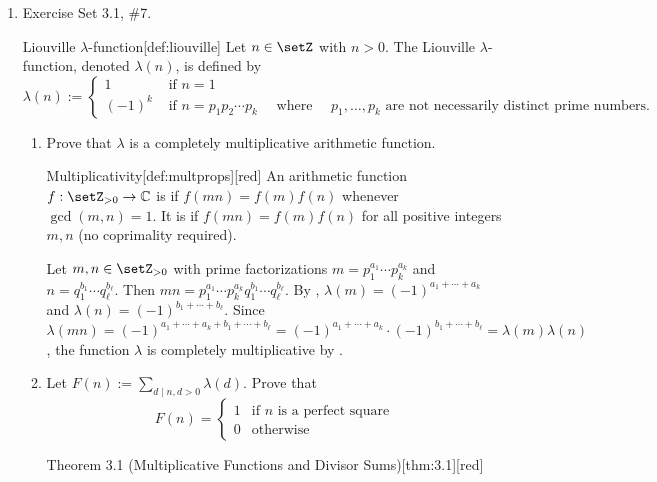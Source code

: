 \begin{enumerate}
  \newpage


  




  \item Exercise Set 3.1, \#7.
  \begin{define}{Liouville $\lambda$-function}[def:liouville]
    Let $n \in \setZ$ with $n>0$. The Liouville $\lambda$-function, 
    denoted $\lambda(n)$, is defined by
    $$
    \lambda(n):= 
    \begin{cases}
      1 & \text { if } n=1 \\ 
      (-1)^k & \text { if } n=p_1 p_2 \cdots p_k \quad \text { where } \quad p_1, \ldots, p_k \text { are not necessarily distinct prime numbers. }
    \end{cases}
    $$
  \end{define}
  \begin{enumerate}
    \item Prove that $\lambda$ is a completely multiplicative arithmetic function.
    \begin{define}{Multiplicativity}[def:multprops][red]
    An arithmetic function $f:\setZ_{>0}\to\mathbb{C}$ is  if $f(mn)=f(m)f(n)$ whenever
    $\gcd(m,n)=1$. It is  if $f(mn)=f(m)f(n)$ for all
    positive integers $m,n$ (no coprimality required).
    \end{define}
    \begin{subprove}
      Let $m,n \in \setZ_{>0}$ with prime factorizations 
      $m = p_1^{a_1} \cdots p_k^{a_k}$ and $n = q_1^{b_1} \cdots q_\ell^{b_\ell}$.
      Then $mn = p_1^{a_1} \cdots p_k^{a_k} q_1^{b_1} \cdots q_\ell^{b_\ell}$.
      By , $\lambda(m) = (-1)^{a_1 + \cdots + a_k}$ and $\lambda(n) = (-1)^{b_1 + \cdots + b_\ell}$.
      Since $\lambda(mn) = (-1)^{a_1 + \cdots + a_k + b_1 + \cdots + b_\ell} = (-1)^{a_1 + \cdots + a_k} \cdot (-1)^{b_1 + \cdots + b_\ell} = \lambda(m)\lambda(n)$,
      the function $\lambda$ is completely multiplicative by .
    \end{subprove}
    \item Let $F(n):=\sum_{d \mid n, d>0} \lambda(d)$. Prove that
    \[
    F(n)= \begin{cases}1 & \text{if } n \text{ is a perfect square} \\ 0 & \text{otherwise}\end{cases}
    \]
    \begin{define}{Theorem 3.1 (Multiplicative Functions and Divisor Sums)}[thm:3.1][red]

\end{define}
\end{enumerate}
\end{enumerate}

